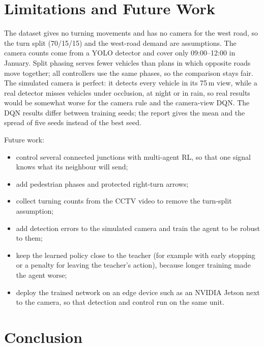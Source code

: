\documentclass[12pt,a4paper]{article}
\begin{document}
\section{Limitations and Future Work}
The dataset gives no turning movements and has no camera for the west road, so the turn split
(70/15/15) and the west-road demand are assumptions. The camera counts come from a YOLO detector
and cover only 09:00--12:00 in January. Split phasing serves fewer vehicles than plans in which
opposite roads move together; all controllers use the same phases, so the comparison stays fair.
The simulated camera is perfect: it detects every vehicle in its 75\,m view, while a real
detector misses vehicles under occlusion, at night or in rain, so real results would be somewhat
worse for the camera rule and the camera-view DQN. The DQN results differ between training seeds;
the report gives the mean and the spread of five seeds instead of the best seed.

Future work:
\begin{itemize}
  \item control several connected junctions with multi-agent RL, so that one signal knows what
        its neighbour will send;
  \item add pedestrian phases and protected right-turn arrows;
  \item collect turning counts from the CCTV video to remove the turn-split assumption;
  \item add detection errors to the simulated camera and train the agent to be robust to them;
  \item keep the learned policy close to the teacher (for example with early stopping or a
        penalty for leaving the teacher's action), because longer training made the agent worse;
  \item deploy the trained network on an edge device such as an NVIDIA Jetson next to the camera,
        so that detection and control run on the same unit.
\end{itemize}

\section{Conclusion}


\clearpage
\appendix
\end{document}
